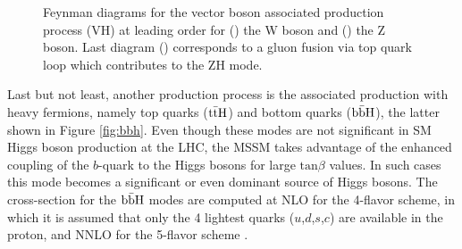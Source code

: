 \begin{figure}
\begin{subfigure}[b]{0.3\textwidth}
  \caption{\label{fig:vh3}}
\end{subfigure}
\caption{Feynman diagrams for the vector boson associated production process (VH) at leading order for () the W boson and () the Z boson. Last diagram () corresponds to a gluon fusion via top quark loop which contributes to the ZH mode.}
\label{fig:vh}
\end{figure}


Last but not least, another production process is the associated production with heavy fermions, namely top quarks ($\mathrm{t\Bar{t}H}$) and bottom quarks ($\mathrm{b\Bar{b}H}$), the latter shown in Figure \ref{fig:bbh}. Even though these modes are not significant in SM Higgs boson production at the LHC, the MSSM takes advantage of the enhanced coupling of the $b$-quark to the Higgs bosons for large $\mathrm{tan} \beta$ values. In such cases this mode becomes a significant or even dominant source of Higgs bosons. The cross-section for the $\mathrm{b\Bar{b}H}$ modes are computed at NLO for the 4-flavor scheme, in which it is assumed that only the 4 lightest quarks ($u$,$d$,$s$,$c$) are available in the proton, and NNLO for the 5-flavor scheme \cite{deFlorian:2227475}.



